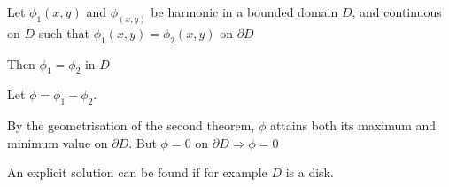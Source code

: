 \par\bigskip
\begin{theo}[]{}
  Let $\phi_1(x,y)$ and $\phi_(x,y)$ be harmonic in a bounded domain $D$, and continuous on $\overline{D}$ such that $\phi_1(x,y) = \phi_2(x,y)$ on $\partial D$\par
  \noindent Then $\phi_1 = \phi_2$ in $D$
\end{theo}
\par\bigskip
\begin{prf}[]{}
  Let $\phi = \phi_1 - \phi_2$.\par
  \noindent By the geometrisation of the second theorem, $\phi$ attains both its maximum and minimum value on $\partial  D$. But $\phi = 0$ on $\partial  D\Rightarrow \phi = 0$
  \par\bigskip
  \noindent An explicit solution can be found if for example $D$ is a disk.
\end{prf}
